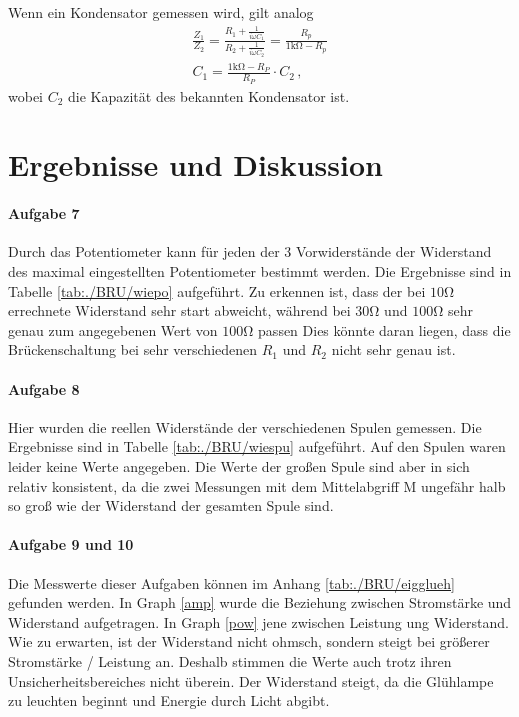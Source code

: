 \documentclass[11pt, a4paper]{article}
\begin{document}
    Wenn ein Kondensator gemessen wird, gilt analog
    \begin{align}
        \frac{Z_1}{Z_2} = \frac{R_1 + \frac{1}{i \omega C_1}}{R_2 + \frac{1}{i \omega C_2}} = \frac{R_p}{1\si{\kilo\ohm} - R_p} \\
        C_1 = \frac{1 \si{\kilo\ohm} - R_P}{R_P} \cdot C_2 \,,
    \end{align}
    wobei $C_2$ die Kapazität des bekannten Kondensator ist.
    \section{Ergebnisse und Diskussion}
    \paragraph{Aufgabe 7}
    Durch das Potentiometer kann für jeden der 3 Vorwiderstände der Widerstand des maximal eingestellten Potentiometer bestimmt werden. Die Ergebnisse sind in Tabelle \ref{tab:./BRU/wiepo} aufgeführt. Zu erkennen ist, dass der bei $10 \si{\ohm}$ errechnete Widerstand sehr start abweicht, während bei $30 \si{\ohm}$ und $100 \si{\ohm}$ sehr genau zum angegebenen Wert von $100 \si{\ohm}$ passen Dies könnte daran liegen, dass die Brückenschaltung bei sehr verschiedenen $R_1$ und $R_2$ nicht sehr genau ist.
    

    \paragraph{Aufgabe 8}
    Hier wurden die reellen Widerstände der verschiedenen Spulen gemessen. Die Ergebnisse sind in Tabelle \ref{tab:./BRU/wiespu} aufgeführt. Auf den Spulen waren leider keine Werte angegeben. Die Werte der großen Spule sind aber in sich relativ konsistent, da die zwei Messungen mit dem Mittelabgriff M ungefähr halb so groß wie der Widerstand der gesamten Spule sind.

    

    \paragraph{Aufgabe 9 und 10}
    Die Messwerte dieser Aufgaben können im Anhang \ref{tab:./BRU/eigglueh} gefunden werden. In Graph \ref{amp} wurde die Beziehung zwischen Stromstärke und Widerstand aufgetragen. In Graph \ref{pow} jene zwischen Leistung ung Widerstand. Wie zu erwarten, ist der Widerstand nicht ohmsch, sondern steigt bei größerer Stromstärke / Leistung an. Deshalb stimmen die Werte auch trotz ihren Unsicherheitsbereiches nicht überein. Der Widerstand steigt, da die Glühlampe zu leuchten beginnt und Energie durch Licht abgibt.
\end{document}
